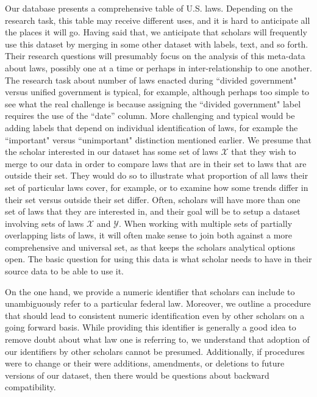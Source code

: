 \documentclass[fleqn,10pt]{wlscirep}
\begin{document}
Our database presents a comprehensive table of U.S. laws. Depending on the research task, this table may receive different uses, and it is hard to anticipate all the places it will go. Having said that, we anticipate that scholars will frequently use this dataset by merging in some other dataset with labels, text, and so forth. Their research questions will presumably focus on the analysis of this meta-data about laws, possibly one at a time or perhaps in inter-relationship to one another. The research task about number of laws enacted during ``divided government" versus unified government is typical, for example, although perhaps too simple to see what the real challenge is because assigning the ``divided government" label requires the use of the ``date'' column. More challenging and typical would be adding labels that depend on individual identification of laws, for example the ``important" versus ``unimportant" distinction mentioned earlier. We presume that the scholar interested in our dataset has some set of laws $\mathcal{X}$ that they wish to merge to our data in order to compare laws that are in their set to laws that are outside their set. They would do so to illustrate what proportion of all laws their set of particular laws cover, for example, or to examine how some trends differ in their set versus outside their set differ. Often, scholars will have more than one set of laws that they are interested in, and their goal will be to setup a dataset involving sets of laws $\mathcal{X}$ and $\mathcal{Y}$. When working with multiple sets of partially overlapping lists of laws, it will often make sense to join both against a more comprehensive and universal set, as that keeps the scholars analytical options open. The basic question for using this data is what scholar needs to have in their source data to be able to use it.

On the one hand, we provide a numeric identifier that scholars can include to unambiguously refer to a particular federal law. Moreover, we outline a procedure that should lead to consistent numeric identification even by other scholars on a going forward basis. While providing this identifier is generally a good idea to remove doubt about what law one is referring to, we understand that adoption of our identifiers by other scholars cannot be presumed. Additionally, if procedures were to change or their were additions, amendments, or deletions to future versions of our dataset, then there would be questions about backward compatibility. 
\end{document}
